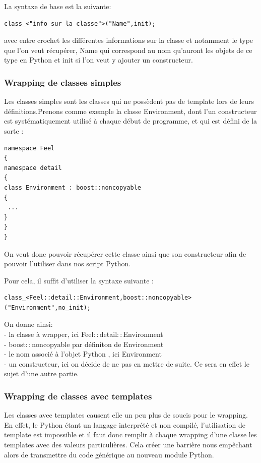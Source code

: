 \documentclass[french,12pt]{article}
\begin{document}
La syntaxe de base est la suivante:
\begin{lstlisting}
class_<"info sur la classe">("Name",init);
\end{lstlisting}
avec entre crochet les différentes informations sur la classe et notamment le type que l'on veut récupérer, Name qui correspond au nom qu'auront les objets de ce type en Python et init si l'on veut y ajouter un constructeur.

\subsubsection{Wrapping de classes simples}
Les classes simples sont les classes qui ne possèdent pas de template lors de leurs définitions.Prenons comme exemple la classe Environment, dont l'un constructeur est systématiquement utilisé à chaque début de programme, et qui est défini de la sorte :

\newpage
\begin{lstlisting}
namespace Feel 
{
namespace detail
{
class Environment : boost::noncopyable
{
 ...
}
}
}
\end{lstlisting}
On veut donc pouvoir récupérer cette classe ainsi que son constructeur afin de pouvoir l'utiliser dans nos script Python. 
\newline

Pour cela, il suffit d'utiliser la syntaxe suivante :
\begin{lstlisting}
class_<Feel::detail::Environment,boost::noncopyable>("Environment",no_init);
\end{lstlisting}

On donne ainsi:\\
- la classe à wrapper, ici Feel$::$detail$::$Environment \\
- boost$::$noncopyable par définiton de Environment \\
- le nom associé à l'objet Python , ici Environment \\
- un constructeur, ici on décide de ne pas en mettre de suite. Ce sera en effet le sujet d'une autre partie.

\subsubsection{Wrapping de classes avec templates}

Les classes avec templates causent elle un peu plus de soucis pour le wrapping.
En effet, le Python étant un langage interprété et non compilé, l'utilisation de template est impossible et il faut donc remplir à chaque wrapping d'une classe les templates avec des valeurs particulières. Cela créer une barrière nous empêchant alors de transmettre du code générique au nouveau module Python.
\newline
\end{document}
